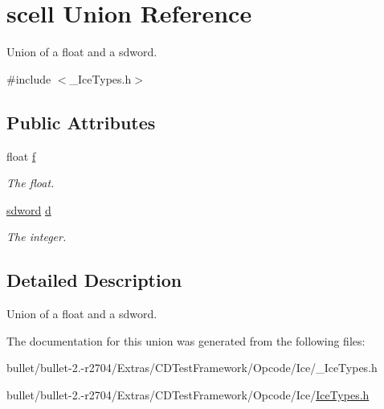 \hypertarget{unionscell}{\section{scell Union Reference}
\label{unionscell}
}


Union of a float and a sdword.  




{\ttfamily \#include $<$\+\_\+\+Ice\+Types.\+h$>$}

\subsection*{Public Attributes}
\begin{DoxyCompactItemize}
\item 
\hypertarget{unionscell_ae396f3517cb7c4d854fb324d413a7c5b}{float \hyperlink{unionscell_ae396f3517cb7c4d854fb324d413a7c5b}{f}}\label{unionscell_ae396f3517cb7c4d854fb324d413a7c5b}

\begin{DoxyCompactList}\small\item\em The float. \end{DoxyCompactList}\item 
\hypertarget{unionscell_a31bdee18ad9fde62940f786210a74725}{\hyperlink{_ice_types_8h_a1459338e4e102e56fead3b10918f15dd}{sdword} \hyperlink{unionscell_a31bdee18ad9fde62940f786210a74725}{d}}\label{unionscell_a31bdee18ad9fde62940f786210a74725}

\begin{DoxyCompactList}\small\item\em The integer. \end{DoxyCompactList}\end{DoxyCompactItemize}


\subsection{Detailed Description}
Union of a float and a sdword. 

The documentation for this union was generated from the following files\+:\begin{DoxyCompactItemize}
\item 
bullet/bullet-\/2.-\/r2704/\+Extras/\+C\+D\+Test\+Framework/\+Opcode/\+Ice/\+\_\+\+Ice\+Types.\+h\item 
bullet/bullet-\/2.-\/r2704/\+Extras/\+C\+D\+Test\+Framework/\+Opcode/\+Ice/\hyperlink{_ice_types_8h}{Ice\+Types.\+h}\end{DoxyCompactItemize}
